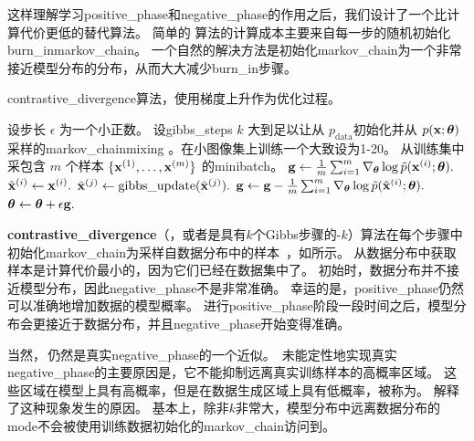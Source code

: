这样理解学习\gls{positive_phase}和\gls{negative_phase}的作用之后，我们设计了一个比计算代价更低的替代算法。
简单的\,\,算法的计算成本主要来自每一步的随机初始化\gls{burn_in}\gls{markov_chain}。
一个自然的解决方法是初始化\gls{markov_chain}为一个非常接近模型分布的分布，从而大大减少\gls{burn_in}步骤。

\begin{algorithm}[ht]
\caption{\gls{contrastive_divergence}算法，使用梯度上升作为优化过程。}
\label{alg:cd}
\begin{algorithmic}
\STATE 设步长 $\epsilon$ 为一个小正数。
\STATE 设\gls{gibbs_steps} $k$ 大到足以让从 $p_\text{data}$初始化并从 $p(\mathbf{x}; \boldsymbol{\theta})$采样的\gls{markov_chain}\gls{mixing} 。在小图像集上训练一个大致设为1-20。
\STATE 从训练集中采包含 $m$ 个样本 $\{ \mathbf{x}^{(1)}, \dots, \mathbf{x}^{(m)}\}$ 的\gls{minibatch}。
\STATE $\mathbf{g} \leftarrow \frac{1}{m} \sum_{i=1}^m \nabla_{\boldsymbol{\theta}} \log \tilde{p}(\mathbf{x}^{(i)}; \boldsymbol{\theta}).$
        \STATE $\tilde{\mathbf{x}}^{(i)} \leftarrow \mathbf{x}^{(i)}.$
    \ENDFOR
{}
        \STATE $\tilde{\mathbf{x}}^{(j)} \leftarrow \text{gibbs\_update}(\tilde{\mathbf{x}}^{(j)}).$
    \ENDFOR
\ENDFOR
\STATE $\mathbf{g} \leftarrow \mathbf{g} - \frac{1}{m} \sum_{i=1}^m \nabla_{\boldsymbol{\theta}} \log \tilde{p}( \tilde{\mathbf{x}}^{(i)} ; \boldsymbol{\theta} ) .$
\STATE $\boldsymbol{\theta} \leftarrow \boldsymbol{\theta} + \epsilon \mathbf{g}.$
\ENDWHILE
\end{algorithmic}
\end{algorithm}

\textbf{\gls{contrastive_divergence}}（，或者是具有$k$个Gibbs步骤的-$k$）算法在每个步骤中初始化\gls{markov_chain}为采样自数据分布中的样本~\citep{Hinton-PoE-2000,Hinton-RBMguide-small}，如所示。
从数据分布中获取样本是计算代价最小的，因为它们已经在数据集中了。
初始时，数据分布并不接近模型分布，因此\gls{negative_phase}不是非常准确。
幸运的是，\gls{positive_phase}仍然可以准确地增加数据的模型概率。
进行\gls{positive_phase}阶段一段时间之后，模型分布会更接近于数据分布，并且\gls{negative_phase}开始变得准确。

当然，\,仍然是真实\gls{negative_phase}的一个近似。
\,未能定性地实现真实\gls{negative_phase}的主要原因是，它不能抑制远离真实训练样本的高概率区域。
这些区域在模型上具有高概率，但是在数据生成区域上具有低概率，被称为。
解释了这种现象发生的原因。
基本上，除非$k$非常大，模型分布中远离数据分布的\gls{mode}不会被使用训练数据初始化的\gls{markov_chain}访问到。



